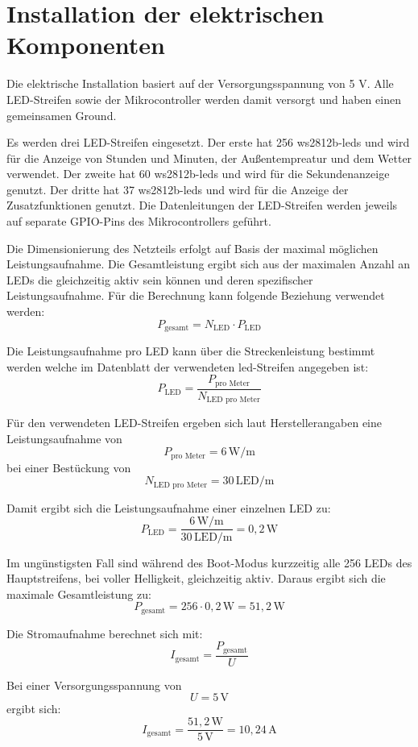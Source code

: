 \section{Installation der elektrischen Komponenten}
Die elektrische Installation basiert auf der Versorgungsspannung von 5 V.  
Alle LED-Streifen sowie der Mikrocontroller werden damit versorgt und haben einen gemeinsamen Ground.  

Es werden drei LED-Streifen eingesetzt. 
Der erste hat 256 \gls{ws2812b}-\gls{led}s und wird für die Anzeige von Stunden und Minuten, der Außentempreatur und dem Wetter verwendet.  
Der zweite hat 60 \gls{ws2812b}-\gls{led}s und wird für die Sekundenanzeige genutzt.
Der dritte hat 37 \gls{ws2812b}-\gls{led}s und wird für die Anzeige der Zusatzfunktionen genutzt.
Die Datenleitungen der LED-Streifen werden jeweils auf separate GPIO-Pins des Mikrocontrollers geführt.  

Die Dimensionierung des Netzteils erfolgt auf Basis der maximal möglichen Leistungsaufnahme.  
Die Gesamtleistung ergibt sich aus der maximalen Anzahl an LEDs die gleichzeitig aktiv sein können und deren spezifischer Leistungsaufnahme.  
Für die Berechnung kann folgende Beziehung verwendet werden:  
\[
P_{\text{gesamt}} = N_{\text{LED}} \cdot P_{\text{LED}}
\]

Die Leistungsaufnahme pro LED kann über die Streckenleistung bestimmt werden welche im Datenblatt der verwendeten \gls{led}-Streifen angegeben ist:  
\[
P_{\text{LED}} = \frac{P_{\text{pro Meter}}}{N_{\text{LED pro Meter}}}
\]

Für den verwendeten LED-Streifen ergeben sich laut Herstellerangaben eine Leistungsaufnahme von  
\[
P_{\text{pro Meter}} = 6\,\text{W/m}
\]
bei einer Bestückung von  
\[
N_{\text{LED pro Meter}} = 30\,\text{LED/m}
\]

Damit ergibt sich die Leistungsaufnahme einer einzelnen LED zu:  
\[
P_{\text{LED}} = \frac{6\,\text{W/m}}{30\,\text{LED/m}}
= 0{,}2\,\text{W}
\]

Im ungünstigsten Fall sind während des Boot-Modus kurzzeitig alle 256 LEDs des Hauptstreifens, bei voller Helligkeit, gleichzeitig aktiv. Daraus ergibt sich die maximale Gesamtleistung zu:  
\[
P_{\text{gesamt}} = 256 \cdot 0{,}2\,\text{W}
= 51{,}2\,\text{W}
\]

Die Stromaufnahme berechnet sich mit:  
\[
I_{\text{gesamt}} = \frac{P_{\text{gesamt}}}{U}
\]

Bei einer Versorgungsspannung von  
\[
U = 5\,\text{V}
\]
ergibt sich:  
\[
I_{\text{gesamt}} = \frac{51{,}2\,\text{W}}{5\,\text{V}}
= 10{,}24\,\text{A}
\]

